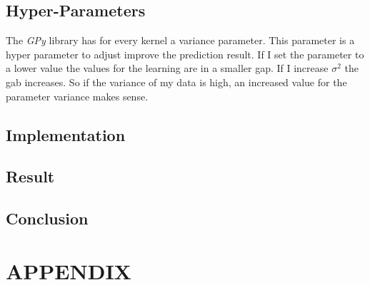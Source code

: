 \documentclass[10pt, a4paper, twocolumn]{article} %
\begin{document}
\subsection{Hyper-Parameters}
The \textit{GPy} library has for every kernel a variance parameter. This parameter is a hyper parameter to adjust improve the prediction result. If I set the parameter to a lower value the values for the learning are in a smaller gap. If I increase $\sigma^2$ the gab increases. So if the variance of my data is high, an increased value for the parameter variance makes sense.

\subsection{Implementation}
\subsection{Result}
\subsection{Conclusion}


\printbibliography[title={Bibliography}] %



\onecolumn\section*{APPENDIX}
\end{document}
